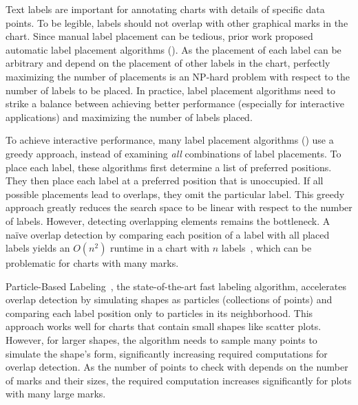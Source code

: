 \maketitle

Text labels are important for annotating charts with details of specific data points.
To be legible, labels should not overlap with other graphical marks in the chart.
Since manual label placement can be tedious, prior work proposed automatic label placement algorithms (\eg \cite{luboschik:particle,mote:informed-greedy,wu:zone,zoraster:int-program,zoraster:annealing}).
As the placement of each label can be arbitrary and depend on the placement of other labels in the chart,
perfectly maximizing the number of placements is an NP-hard problem with respect to the number of labels to be placed.
In practice, label placement algorithms need to strike a balance between achieving better performance
(especially for interactive applications) and maximizing the number of labels placed.

To achieve interactive performance, many label placement algorithms (\eg \cite{luboschik:particle,mote:informed-greedy}) use a greedy approach, instead of examining \emph{all} combinations of label placements.
To place each label, these algorithms first determine a list of preferred positions.
They then place each label at a preferred position that is unoccupied.
If all possible placements lead to overlaps, they omit the particular label.
This greedy approach greatly reduces the search space to be linear with respect to the number of labels.
However, detecting overlapping elements remains the bottleneck.
A naïve overlap detection by comparing each position of a label with all placed labels yields an $O(n^2)$ runtime in a chart with $n$ labels~\cite{emden:prism}, which can be problematic for charts with many marks.

Particle-Based Labeling~\cite{luboschik:particle}, the state-of-the-art fast labeling algorithm,
accelerates overlap detection by simulating shapes as particles (collections of points) and
comparing each label position only to particles in its neighborhood.
This approach works well for charts that contain small shapes like scatter plots.
However, for larger shapes, the algorithm needs to sample many points to simulate the shape's form,
significantly increasing required computations for overlap detection.
As the number of points to check with depends on the number of marks and their sizes, the required computation increases significantly for plots with many large marks.

